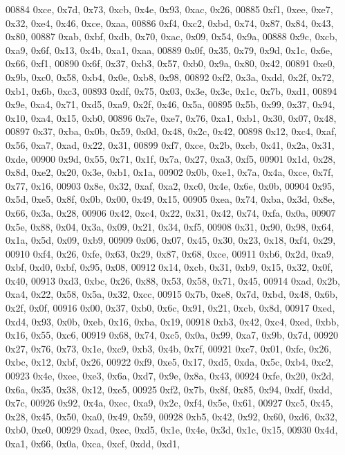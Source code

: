 \begin{DoxyCode}
00884   0xce, 0x7d, 0x73, 0xcb, 0x4e, 0x93, 0xac, 0x26,
00885   0xf1, 0xee, 0xe7, 0x32, 0xe4, 0x46, 0xce, 0xaa,
00886   0xf4, 0xc2, 0xbd, 0x74, 0x87, 0x84, 0x43, 0x80,
00887   0xab, 0xbf, 0xdb, 0x70, 0xac, 0x09, 0x54, 0x9a,
00888   0x9c, 0xcb, 0xa9, 0x6f, 0x13, 0x4b, 0xa1, 0xaa,
00889   0x0f, 0x35, 0x79, 0x9d, 0x1c, 0x6e, 0x66, 0xf1,
00890   0x6f, 0x37, 0xb3, 0x57, 0xb0, 0x9a, 0x80, 0x42,
00891   0xe0, 0x9b, 0xc0, 0x58, 0xb4, 0x0e, 0xb8, 0x98,
00892   0xf2, 0x3a, 0xdd, 0x2f, 0x72, 0xb1, 0x6b, 0xc3,
00893   0xdf, 0x75, 0x03, 0x3e, 0x3c, 0x1c, 0x7b, 0xd1,
00894   0x9e, 0xa4, 0x71, 0xd5, 0xa9, 0x2f, 0x46, 0x5a,
00895   0x5b, 0x99, 0x37, 0x94, 0x10, 0xa4, 0x15, 0xb0,
00896   0x7e, 0xe7, 0x76, 0xa1, 0xb1, 0x30, 0x07, 0x48,
00897   0x37, 0xba, 0x0b, 0x59, 0x0d, 0x48, 0x2c, 0x42,
00898   0x12, 0xc4, 0xaf, 0x56, 0xa7, 0xad, 0x22, 0x31,
00899   0xf7, 0xce, 0x2b, 0xcb, 0x41, 0x2a, 0x31, 0xde,
00900   0x9d, 0x55, 0x71, 0x1f, 0x7a, 0x27, 0xa3, 0xf5,
00901   0x1d, 0x28, 0x8d, 0xe2, 0x20, 0x3e, 0xb1, 0x1a,
00902   0x0b, 0xe1, 0x7a, 0x4a, 0xce, 0x7f, 0x77, 0x16,
00903   0x8e, 0x32, 0xaf, 0xa2, 0xc0, 0x4e, 0x6e, 0x0b,
00904   0x95, 0x5d, 0xe5, 0x8f, 0x0b, 0x00, 0x49, 0x15,
00905   0xea, 0x74, 0xba, 0x3d, 0x8e, 0x66, 0x3a, 0x28,
00906   0x42, 0xc4, 0x22, 0x31, 0x42, 0x74, 0xfa, 0x0a,
00907   0x5e, 0x88, 0x04, 0x3a, 0x09, 0x21, 0x34, 0xf5,
00908   0x31, 0x90, 0x98, 0x64, 0x1a, 0x5d, 0x09, 0xb9,
00909   0x06, 0x07, 0x45, 0x30, 0x23, 0x18, 0xf4, 0x29,
00910   0xf4, 0x26, 0xfe, 0x63, 0x29, 0x87, 0x68, 0xce,
00911   0xb6, 0x2d, 0xa9, 0xbf, 0xd0, 0xbf, 0x95, 0x08,
00912   0x14, 0xcb, 0x31, 0xb9, 0x15, 0x32, 0x0f, 0x40,
00913   0xd3, 0xbc, 0x26, 0x88, 0x53, 0x58, 0x71, 0x45,
00914   0xad, 0x2b, 0xa4, 0x22, 0x58, 0x5a, 0x32, 0xcc,
00915   0x7b, 0xe8, 0x7d, 0xbd, 0x48, 0x6b, 0x2f, 0x0f,
00916   0x00, 0x37, 0xb0, 0x6c, 0x91, 0x21, 0xcb, 0x8d,
00917   0xed, 0xd4, 0x93, 0x0b, 0xeb, 0x16, 0xba, 0x19,
00918   0xb3, 0x42, 0xc4, 0xed, 0xbb, 0x16, 0x55, 0xc6,
00919   0x68, 0x74, 0xc5, 0x0a, 0x99, 0xa7, 0x9b, 0x7d,
00920   0x27, 0x76, 0x73, 0x1e, 0xc9, 0xb3, 0x4b, 0x7f,
00921   0xc7, 0x01, 0xfc, 0x26, 0xbc, 0x12, 0xbf, 0x26,
00922   0xf9, 0xe5, 0x17, 0xd5, 0xda, 0x5c, 0xb4, 0xc2,
00923   0x4e, 0xee, 0xe3, 0x6a, 0xd7, 0x9e, 0x8a, 0x43,
00924   0xfe, 0x20, 0x2d, 0x6a, 0x35, 0x38, 0x12, 0xe5,
00925   0xf2, 0x7b, 0x8f, 0x85, 0x94, 0xdf, 0xdd, 0x7c,
00926   0x92, 0x4a, 0xec, 0xa9, 0x2c, 0xf4, 0x5e, 0x61,
00927   0xc5, 0x45, 0x28, 0x45, 0x50, 0xa0, 0x49, 0x59,
00928   0xb5, 0x42, 0x92, 0x60, 0xd6, 0x32, 0xb0, 0xe0,
00929   0xad, 0xec, 0xd5, 0x1e, 0x4e, 0x3d, 0x1c, 0x15,
00930   0x4d, 0xa1, 0x66, 0x0a, 0xca, 0xcf, 0xdd, 0xd1,

\end{DoxyCode}

